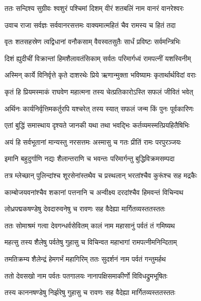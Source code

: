 
\twolineshloka
{ततः सन्दिश्य सुग्रीवः श्वशुरं पश्चिमां दिशम्}
{वीरं शतबलिं नाम वानरं वानरेश्वरः} %

\twolineshloka
{उवाच राजा सर्वज्ञः सर्ववानरसत्तमः}
{वाक्यमात्महितं चैव रामस्य च हितं तदा} %

\twolineshloka
{वृतः शतसहस्रेण त्वद्विधानां वनौकसाम्}
{वैवस्वतसुतैः सार्धं प्रविष्टः सर्वमन्त्रिभिः} %

\twolineshloka
{दिशं ह्युदीचीं विक्रान्तां हिमशैलावतंसिकाम्}
{सर्वतः परिमार्गध्वं रामपत्नीं यशस्विनीम्} %

\twolineshloka
{अस्मिन् कार्ये विनिर्वृत्ते कृते दाशरथेः प्रिये}
{ऋणान्मुक्ता भविष्यामः कृतार्थार्थविदां वराः} %

\twolineshloka
{कृतं हि प्रियमस्माकं राघवेण महात्मना}
{तस्य चेत्प्रतिकारोऽस्ति सफलं जीवितं भवेत्} %

\twolineshloka
{अर्थिनः कार्यनिर्वृत्तिमकर्तुरपि यश्चरेत्}
{तस्य स्यात् सफलं जन्म किं पुनः पूर्वकारिणः} %

\twolineshloka
{एतां बुद्धिं समास्थाय दृश्यते जानकी यथा}
{तथा भवद्भिः कर्तव्यमस्मत्प्रियहितैषिभिः} %

\twolineshloka
{अयं हि सर्वभूतानां मान्यस्तु नरसत्तमः}
{अस्मासु च गतः प्रीतिं रामः परपुरञ्जयः} %

\twolineshloka
{इमानि बहुदुर्गाणि नद्यः शैलान्तराणि च}
{भवन्तः परिमार्गन्तु बुद्धिविक्रमसम्पदा} %

\twolineshloka
{तत्र म्लेच्छान् पुलिन्दांश्च शूरसेनांस्तथैव च}
{प्रस्थलान् भरतांश्चैव कुरूंश्च सह मद्रकैः} %

\twolineshloka
{काम्बोजयवनांश्चैव शकानां पत्तनानि च}
{अन्वीक्ष्य दरदांश्चैव हिमवन्तं विचिन्वथ} %

\twolineshloka
{लोध्रपद्मकषण्डेषु देवदारुवनेषु च}
{रावणः सह वैदेह्या मार्गितव्यस्ततस्ततः} %

\twolineshloka
{ततः सोमाश्रमं गत्वा देवगन्धर्वसेवितम्}
{कालं नाम महासानुं पर्वतं तं गमिष्यथ} %

\twolineshloka
{महत्सु तस्य शैलेषु पर्वतेषु गुहासु च}
{विचिन्वत महाभागां रामपत्नीमनिन्दिताम्} %

\twolineshloka
{तमतिक्रम्य शैलेन्द्रं हेमगर्भं महागिरिम्}
{ततः सुदर्शनं नाम पर्वतं गन्तुमर्हथ} %

\twolineshloka
{ततो देवसखो नाम पर्वतः पतगालयः}
{नानापक्षिसमाकीर्णो विविधद्रुमभूषितः} %

\twolineshloka
{तस्य काननषण्डेषु निर्झरेषु गुहासु च}
{रावणः सह वैदेह्या मार्गितव्यस्ततस्ततः} %

